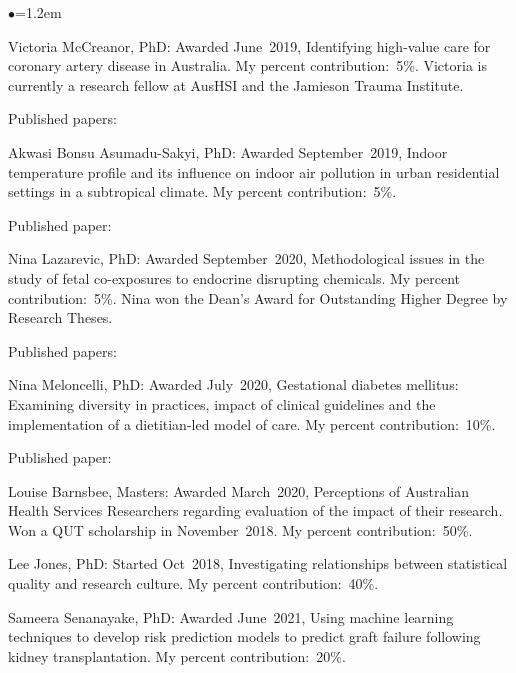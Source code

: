 \documentclass[a4paper,11pt]{article}
\renewcommand{\labelitemi}{$\bullet$}
\begin{document}
\begin{raggedright}
\begin{list}{\labelitemi}{\leftmargin=1.2em}
\item Victoria McCreanor, PhD: Awarded June~2019, Identifying high-value care for coronary artery disease in Australia. My percent contribution:~5\%. Victoria is currently a research fellow at AusHSI and the Jamieson Trauma Institute.

Published papers: 

\item Akwasi Bonsu Asumadu-Sakyi, PhD: Awarded September~2019, Indoor temperature profile and its influence on indoor air pollution in urban residential settings in a subtropical climate. My percent contribution:~5\%.

Published paper: 

\item Nina Lazarevic, PhD: Awarded September~2020, Methodological issues in the study of fetal co-exposures to endocrine disrupting chemicals. My percent contribution:~5\%. Nina won the Dean’s Award for Outstanding Higher Degree by Research Theses.

 Published papers: 

\item Nina Meloncelli, PhD: Awarded July~2020, Gestational diabetes mellitus: Examining diversity in practices, impact of clinical guidelines and the implementation of a dietitian-led model of care. My percent contribution:~10\%.

Published paper: 

\item Louise Barnsbee, Masters: Awarded March~2020, Perceptions of Australian Health Services Researchers regarding evaluation of the impact of their research. Won a QUT scholarship in November~2018. My percent contribution:~50\%.

\item Lee Jones, PhD: Started Oct~2018, Investigating relationships between statistical quality and research culture. My percent contribution:~40\%.

\item Sameera Senanayake, PhD: Awarded June~2021, Using machine learning techniques to develop risk prediction models to predict graft failure following kidney transplantation. My percent contribution:~20\%.


\end{list}
\end{raggedright}
\end{document}
